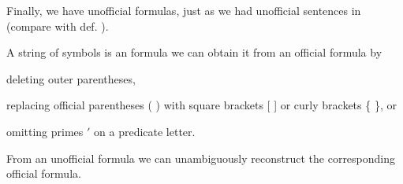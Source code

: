 Finally, we have unofficial formulas, just as we had unofficial sentences in \GSL{} (compare with def. ).
\begin{majorILnc}{}
A string of symbols is an  formula \Iff we can obtain it from an official formula by
\begin{cenumerate}
\item deleting outer parentheses,
\item replacing official parentheses ( ) with square brackets [ ] or curly brackets \{ \}, or
\item omitting primes $'$ on a predicate letter.
\end{cenumerate}
\end{majorILnc}
\noindent{}From an unofficial formula we can unambiguously reconstruct the corresponding official formula.

